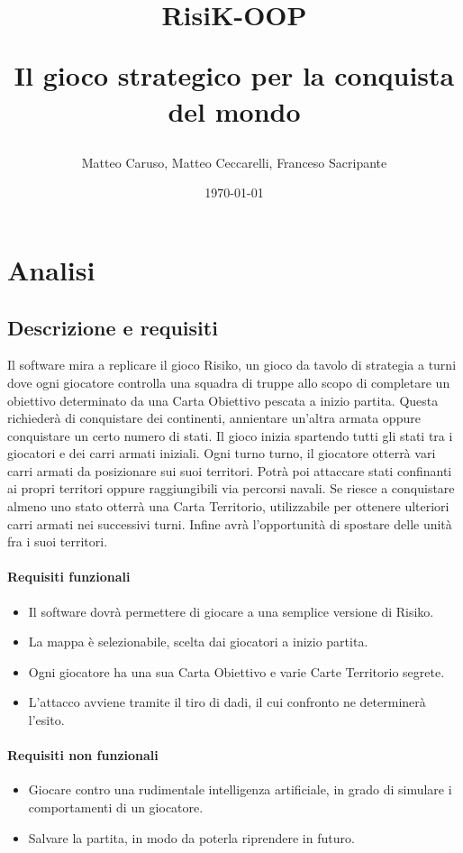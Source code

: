 \documentclass[a4paper,12pt]{report}
\title{
RisiK-OOP \\
\begin{large}
Il gioco strategico per la conquista del mondo
\end{large}
}
\author{Matteo Caruso, Matteo Ceccarelli, Franceso Sacripante}
\date{\today}
\begin{document}
\maketitle

\tableofcontents

\chapter{Analisi}

\section{Descrizione e requisiti}

Il software mira a replicare il gioco Risiko, un gioco da tavolo di strategia a turni dove ogni giocatore controlla una squadra di truppe allo scopo di completare un obiettivo determinato da una Carta Obiettivo pescata a inizio partita.
Questa richiederà di conquistare dei continenti, annientare un'altra armata oppure conquistare un certo numero di stati.
Il gioco inizia spartendo tutti gli stati tra i giocatori e dei carri armati iniziali.
Ogni turno turno, il giocatore otterrà vari carri armati da posizionare sui suoi territori.
Potrà poi attaccare stati confinanti ai propri territori oppure raggiungibili via percorsi navali.
Se riesce a conquistare almeno uno stato otterrà una Carta Territorio, utilizzabile per ottenere ulteriori carri armati nei successivi turni.
Infine avrà l'opportunità di spostare delle unità fra i suoi territori.

\subsubsection{Requisiti funzionali}
\begin{itemize}
	\item Il software dovrà permettere di giocare a una semplice versione di Risiko.
	\item La mappa è selezionabile, scelta dai giocatori a inizio partita.
	\item Ogni giocatore ha una sua Carta Obiettivo e varie Carte Territorio segrete.
	\item L'attacco avviene tramite il tiro di dadi, il cui confronto ne determinerà l'esito.
\end{itemize}

\subsubsection{Requisiti non funzionali}
\begin{itemize}
	\item Giocare contro una rudimentale intelligenza artificiale, in grado di simulare i comportamenti di un giocatore.
	\item Salvare la partita, in modo da poterla riprendere in futuro.
\end{itemize}
\end{document}
